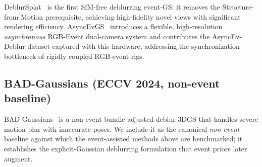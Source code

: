DeblurSplat~\cite{li2025deblursplat} is the first SfM-free deblurring event-GS: it removes the Structure-from-Motion prerequisite, achieving high-fidelity novel views with significant rendering efficiency. AsyncEvGS~\cite{dai2026asyncevgs} introduces a flexible, high-resolution \emph{asynchronous} RGB-Event dual-camera system and contributes the AsyncEv-Deblur dataset captured with this hardware, addressing the synchronization bottleneck of rigidly coupled RGB-event rigs.

\subsection{BAD-Gaussians (ECCV 2024, non-event baseline)}
\label{sec:deblur:bad}

BAD-Gaussians~\cite{zhao2024badgaussians} is a non-event bundle-adjusted deblur 3DGS that handles severe motion blur with inaccurate poses. We include it as the canonical \emph{non-event} baseline against which the event-assisted methods above are benchmarked; it establishes the explicit-Gaussian deblurring formulation that event priors later augment.
